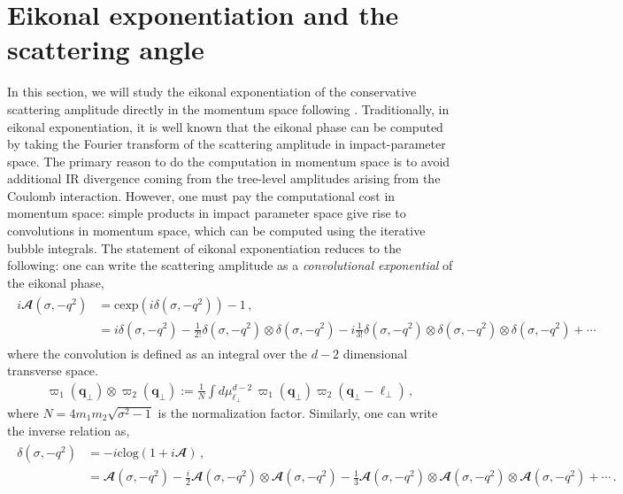 \section{Eikonal exponentiation and the scattering angle}\label{ch4:sec5}
In this section, we will study the eikonal exponentiation of the conservative scattering amplitude directly in the momentum space following \cite{Parra-Martinez:2020dzs}. Traditionally, in eikonal exponentiation, it is well known that the eikonal phase can be computed by taking the Fourier transform of the scattering amplitude in impact-parameter space.
The primary reason to do the computation in momentum space is to avoid additional IR divergence coming from the tree-level amplitudes arising from the Coulomb interaction. However, one must pay the computational cost in momentum space: simple products in impact parameter space give rise to convolutions in momentum space, which can be computed using the iterative bubble integrals. The statement of eikonal exponentiation reduces to the following: one can write the scattering amplitude as a \textit{convolutional exponential} of the eikonal phase,
\begin{align}
\begin{split}
    i\mathbfcal{A}(\sigma,-q^2)&=\textrm{cexp}\left(i\delta(\sigma,-q^2)\right)-1\,,\\ &
    =i\delta(\sigma,-q^2)-\frac{1}{2!}\delta(\sigma,-q^2)\otimes \delta(\sigma,-q^2)-i\frac{1}{3!}\delta(\sigma,-q^2)\otimes \delta(\sigma,-q^2)\otimes\delta(\sigma,-q^2)+\cdots
    \end{split}
\end{align}
where the convolution is defined as an integral over the $d-2$ dimensional transverse space.
\begin{align}    \varpi_1(\boldsymbol{q}_{\perp})\otimes \varpi_2(\boldsymbol{q}_{\perp}):=\frac{1}{N}\int d\mu_{\boldsymbol{\ell}_{\perp}}^{d-2}\,\varpi_1(\boldsymbol{q}_{\perp})\varpi_2(\boldsymbol{q}_{\perp}-\boldsymbol{\ell}_{\perp})\,,
\end{align}
where $N=4 m_1 m_2 \sqrt{\sigma^2-1}$ is the normalization factor. Similarly, one can write the inverse relation as,
\begin{align}
    \begin{split}
        \delta(\sigma,-q^2)&=-i\textrm{clog}(1+i \mathbfcal{A})\,, \\
        &=\mathbfcal{A}(\sigma ,-q^2)-\frac{i}{2}\mathbfcal{A}(\sigma ,-q^2) \otimes\mathbfcal{A}(\sigma ,-q^2) -\frac{1}{3}\mathbfcal{A}(\sigma ,-q^2) \otimes \mathbfcal{A}(\sigma ,-q^2) \otimes\mathbfcal{A}(\sigma ,-q^2)+\cdots\,.
    \end{split}
\end{align}
